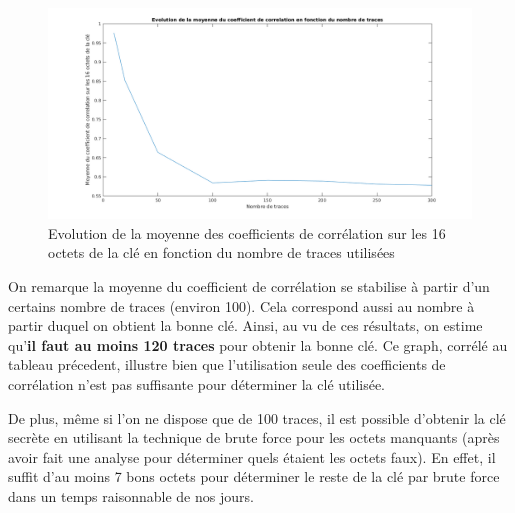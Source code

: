 \documentclass[a4paper, 12pt]{article}
\begin{document}
		\begin{figure}[H]
			\begin{center}
			\includegraphics[scale=0.5]{images/corr_avg_evol.png}
			\end{center}
			\caption{Evolution de la moyenne des coefficients de corrélation sur les 16 octets de la clé en fonction du nombre de traces utilisées}
			\label{corr_avg_evol}
		\end{figure}

On remarque la moyenne du coefficient de corrélation se stabilise à partir d'un certains nombre de traces (environ 100). Cela correspond aussi au nombre à partir duquel on obtient la bonne clé. Ainsi, au vu de ces résultats, on estime qu'\textbf{il faut au moins 120 traces} pour obtenir la bonne clé. Ce graph, corrélé au tableau précedent, illustre bien que l'utilisation seule des coefficients de corrélation n'est pas suffisante pour déterminer la clé utilisée. 

De plus, même si l'on ne dispose que de 100 traces, il est possible d'obtenir la clé secrète en utilisant la technique de brute force pour les octets manquants (après avoir fait une analyse pour déterminer quels étaient les octets faux). En effet, il suffit d'au moins 7 bons octets pour déterminer le reste de la clé par brute force dans un temps raisonnable de nos jours. 
\end{document}
